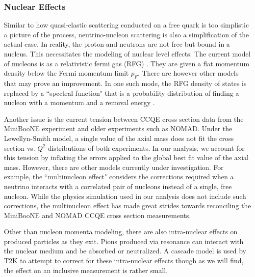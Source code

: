 \subsubsection{Nuclear Effects}

Similar to how quasi-elastic scattering conducted on a free quark is too simplistic a picture of the process, neutrino-nucleon scattering is also a simplification of the actual case. In reality, the proton and neutrons are not free but bound in a nucleus. This necessitates the modeling of nuclear level effects. The current model of nucleons is as a relativistic fermi gas (RFG) \cite{RFG}. They are given a flat momentum density below the Fermi momentum limit $p_F$. There are however other models that may prove an improvement. In one such mode, the RFG density of states is replaced by a ``spectral function" that is a probability distribution of finding a nucleon with a momentum and a removal energy \cite{SF}.

Another issue is the current tension between CCQE cross section data from the MiniBooNE experiment and older experiments such as NOMAD. Under the Lewellyn-Smith model, a single value of the axial mass does not fit the cross section vs. $Q^2$ distributions of both experiments. In our analysis, we account for this tension by inflating the errors applied to the global best fit value of the axial mass. However, there are other models currently under investigation. For example, the ``multinucleon effect" considers the corrections required when a neutrino interacts with a correlated pair of nucleons instead of a single, free nucleon. While the physics simulation used in our analysis does not include such corrections, the multinucleon effect has made great strides towards reconciling the MiniBooNE and NOMAD CCQE cross section measurements.

Other than nucleon momenta modeling, there are also intra-nuclear effects on produced particles as they exit. Pions produced via resonance can interact with the nuclear medium and be absorbed or neutralized. A cascade model is used by T2K to attempt to correct for these intra-nuclear effects though as we will find, the effect on an inclusive measurement is rather small. 
